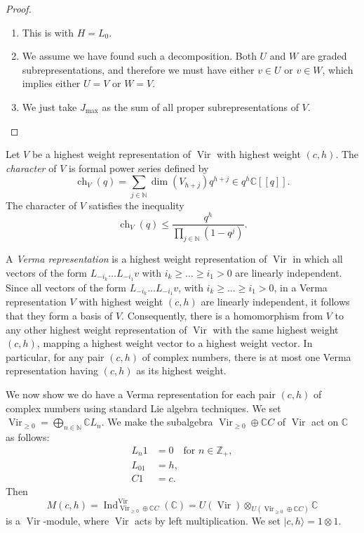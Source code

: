 \documentclass[a4paper, 12pt, reqno]{amsart}
\theoremstyle{remark}
\numberwithin{equation}{subsection}
\DeclareMathOperator{\Vir}{Vir}
\DeclareMathOperator{\ch}{ch}
\DeclareMathOperator{\Ind}{Ind}
\begin{document}
\begin{proof}\leavevmode
  \begin{enumerate}
  \item This is  with $H = L_0$.
  \item We assume we have found such a decomposition.
    Both $U$ and $W$ are graded subrepresentations, and therefore we must have either $v \in U$ or $v \in W$, which implies either $U = V$ or $W = V$.
  \item We just take $J_{\max}$ as the sum of all proper subrepresentations of $V$. \qedhere
  \end{enumerate}
\end{proof}

Let $V$ be a highest weight representation of $\Vir$ with highest weight $(c, h)$.
The \emph{character} of $V$ is formal power series defined by
\begin{equation*}
  \ch_V(q) = \sum_{j \in \mathbb{N}}\dim(V_{h + j})q^{h + j} \in q^h\mathbb{C}[[q]].
\end{equation*}
The character of $V$ satisfies the inequality
\begin{equation*}
  \ch_V(q) \le \frac{q^h}{\prod_{j \in \mathbb{N}}(1 - q^j)}.
\end{equation*}

A \emph{Verma representation} is a highest weight representation of $\Vir$ in which all vectors of the form $L_{-i_k}\dots L_{-i_1}v$ with $i_k \ge \dots \ge i_1 > 0$ are linearly independent.
Since all vectors of the form $L_{-i_k}\dots L_{-i_1}v$, with $i_k \ge \dots \ge i_1 > 0$, in a Verma representation $V$ with highest weight $(c, h)$ are linearly independent, it follows that they form a basis of $V$.
Consequently, there is a homomorphism from $V$ to any other highest weight representation of $\Vir$ with the same highest weight $(c, h)$, mapping a highest weight vector to a highest weight vector.
In particular, for any pair $(c, h)$ of complex numbers, there is at most one Verma representation having $(c, h)$ as its highest weight.

We now show we do have a Verma representation for each pair $(c, h)$ of complex numbers using standard Lie algebra techniques.
We set $\Vir_{\ge 0} = \bigoplus_{n \in \mathbb{N}}\mathbb{C}L_n$.
We make the subalgebra $\Vir_{\ge 0} \oplus \mathbb{C}C$ of $\Vir$ act on $\mathbb{C}$ as follows:
\begin{align*}
  L_n1 &= 0 \quad \text{for }n \in \mathbb{Z}_+, \\
  L_01 &= h, \\
  C1 &= c.
\end{align*}
Then
\begin{equation*}
  M(c, h) = \Ind^{\Vir}_{\Vir_{\ge 0} \oplus \mathbb{C}C}(\mathbb{C}) = U(\Vir) \otimes_{U(\Vir_{\ge 0} \oplus \mathbb{C}C)} \mathbb{C}
\end{equation*}
is a $\Vir$-module, where $\Vir$ acts by left multiplication.
We set $|c, h\rangle = 1\otimes1$.
\end{document}
